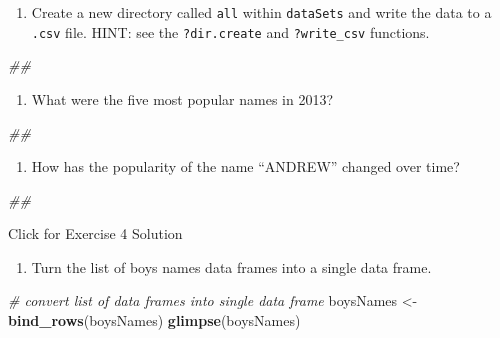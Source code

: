 \documentclass[
]{book}
\newenvironment{Shaded}{\begin{snugshade}}{\end{snugshade}}
\newcommand{\CommentTok}[1]{\textcolor[rgb]{0.56,0.35,0.01}{\textit{#1}}}
\newcommand{\KeywordTok}[1]{\textcolor[rgb]{0.13,0.29,0.53}{\textbf{#1}}}
\newcommand{\NormalTok}[1]{#1}
\newcommand{\StringTok}[1]{\textcolor[rgb]{0.31,0.60,0.02}{#1}}
\providecommand{\tightlist}{%
  \setlength{\itemsep}{0pt}\setlength{\parskip}{0pt}}
\begin{document}
\begin{enumerate}
\def\labelenumi{\arabic{enumi}.}
\setcounter{enumi}{1}
\tightlist
\item
  Create a new directory called \texttt{all} within \texttt{dataSets} and write the data to a \texttt{.csv} file. HINT: see the \texttt{?dir.create} and \texttt{?write\_csv} functions.
\end{enumerate}

\begin{Shaded}
\begin{Highlighting}[]
\CommentTok{\#\# }
\end{Highlighting}
\end{Shaded}

\begin{enumerate}
\def\labelenumi{\arabic{enumi}.}
\setcounter{enumi}{2}
\tightlist
\item
  What were the five most popular names in 2013?
\end{enumerate}

\begin{Shaded}
\begin{Highlighting}[]
\CommentTok{\#\# }
\end{Highlighting}
\end{Shaded}

\begin{enumerate}
\def\labelenumi{\arabic{enumi}.}
\setcounter{enumi}{3}
\tightlist
\item
  How has the popularity of the name ``ANDREW'' changed over time?
\end{enumerate}

\begin{Shaded}
\begin{Highlighting}[]
\CommentTok{\#\# }
\end{Highlighting}
\end{Shaded}

{Click for Exercise 4 Solution}

\begin{enumerate}
\def\labelenumi{\arabic{enumi}.}
\tightlist
\item
  Turn the list of boys names data frames into a single data frame.
\end{enumerate}

\begin{Shaded}
\begin{Highlighting}[]
\CommentTok{\# convert list of data frames into single data frame}
\NormalTok{boysNames \textless{}{-}}\StringTok{ }\KeywordTok{bind\_rows}\NormalTok{(boysNames)}
\KeywordTok{glimpse}\NormalTok{(boysNames)}
\end{Highlighting}
\end{Shaded}
\end{document}
